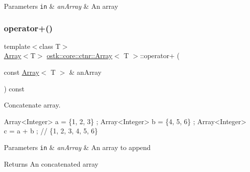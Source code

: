 \begin{DoxyParams}[1]{Parameters}
\mbox{\tt in}  & {\em an\+Array} & An array \\
\hline
\end{DoxyParams}
\mbox{\label{classostk_1_1core_1_1ctnr_1_1_array_a9326348f023fe3a714249071ed185ef4}} 
\subsubsection{\texorpdfstring{operator+()}{operator+()}}
{\footnotesize\ttfamily template$<$class T$>$ \\
\hyperlink{classostk_1_1core_1_1ctnr_1_1_array}{Array}$<$T$>$ \hyperlink{classostk_1_1core_1_1ctnr_1_1_array}{ostk\+::core\+::ctnr\+::\+Array}$<$ T $>$\+::operator+ (\begin{DoxyParamCaption}\item[{const \hyperlink{classostk_1_1core_1_1ctnr_1_1_array}{Array}$<$ T $>$ \&}]{an\+Array }\end{DoxyParamCaption}) const}



Concatenate array. 


\begin{DoxyCode}
Array<Integer> a = \{1, 2, 3\} ;
Array<Integer> b = \{4, 5, 6\} ;
Array<Integer> c = a + b ; \textcolor{comment}{// \{1, 2, 3, 4, 5, 6\}}
\end{DoxyCode}



\begin{DoxyParams}[1]{Parameters}
\mbox{\tt in}  & {\em an\+Array} & An array to append \\
\hline
\end{DoxyParams}
\begin{DoxyReturn}{Returns}
An concatenated array 
\end{DoxyReturn}
\mbox{\label{classostk_1_1core_1_1ctnr_1_1_array_af0eab66650f3f3d27c0fab8da87ebd32}} 
